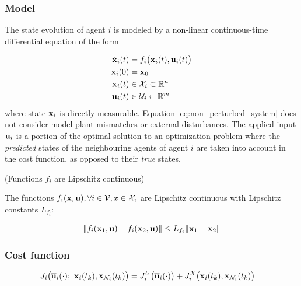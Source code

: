 \subsubsection{Model}

The state evolution of agent $i$ is modeled by a non-linear continuous-time
differential equation of the form

\begin{align}
  \dot{\bm{\mathbf{x}}}_i(t) &= f_i \big(\bm{\mathbf{x}}_i (t), \bm{\mathbf{u}}_i (t)\big) \label{eq:non_perturbed_system}\\
  \bm{\mathbf{x}}_i(0) &= \bm{\mathbf{x}}_0 \\
  \bm{\mathbf{x}}_i (t) &\in \mathcal{X}_i \subset \mathbb{R}^n \\
  \bm{\mathbf{u}}_i (t) &\in \mathcal{U}_i \subset \mathbb{R}^m
\end{align}
where state $\bm{\mathbf{x}}_i$ is directly measurable. Equation
\ref{eq:non_perturbed_system} does not consider model-plant mismatches or
external disturbances. The applied input $\bm{\mathbf{u}}_i$ is a portion of the
optimal solution to an optimization problem where the \textit{predicted} states
of the neighbouring agents of agent $i$ are taken into account in the cost
function, as opposed to their \textit{true} states.

\begin{gg_box}
\begin{assumption} (Functions $f_i$ are Lipschitz continuous)

  The functions $f_i(\bm{\mathbf{x}}, \bm{\mathbf{u}}), \forall i \in \mathcal{V}, x \in \mathcal{X}_i$
  are Lipschitz continuous with Lipschitz constants $L_{f_i}$:

  \begin{align}
    \| f_i(\bm{\mathbf{x}}_1, \bm{\mathbf{u}}) - f_i(\bm{\mathbf{x}}_2, \bm{\mathbf{u}})\| \leq L_{f_i} \|\bm{\mathbf{x}}_1 - \bm{\mathbf{x}}_2 \|
  \end{align}

  \label{ass:f_i_Lipschitz}
\end{assumption}
\end{gg_box}


\subsubsection{Cost function}

\begin{align}
  J_i \big(\overline{\bm{\mathbf{u}}}_i (\cdot);\ \bm{\mathbf{x}}_i(t_k), \bm{\mathbf{x}}_{\mathcal{N}_i}(t_k)\big) &=
    J_i^U \big(\overline{\bm{\mathbf{u}}}_i (\cdot) \big) +
    J_i^X \big(\bm{\mathbf{x}}_i (t_k), \bm{\mathbf{x}}_{\mathcal{N}_i}(t_k)\big)
\end{align}

